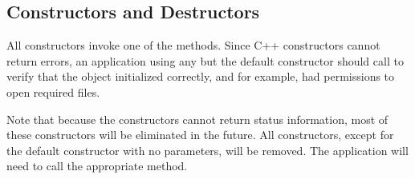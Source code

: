 \subsection{Constructors and Destructors}

All  constructors invoke one of the 
methods.
Since C++ constructors cannot return errors, 
an application using any but the default constructor should call
 to verify that the object initialized correctly,
and for example, had permissions to open required files.

Note that because the constructors cannot return status information,
most of these constructors will be eliminated in the future.
All constructors, except for the default constructor with no parameters,
will be removed.
The application will need to call the appropriate  method.

